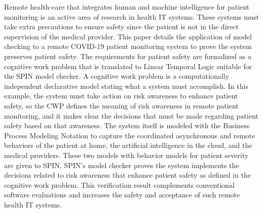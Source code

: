 Remote health-care that integrates human and machine intelligence for patient monitoring is an active area of research in health IT systems. These systems must take extra precautions to ensure safety since the patient is not in the direct supervision of the medical provider. This paper details the application of model checking to a remote COVID-19 patient monitoring system to prove the system preserves patient safety. The requirements for patient safety are formalized as a cognitive work problem that is translated to Linear Temporal Logic suitable for the SPIN model checker. A cognitive work problem is a computationally independent declarative model stating what a system must accomplish. In this example, the system must take action on risk awareness to enhance patient safety, so the CWP defines the meaning of risk awareness in remote patient monitoring, and it makes clear the decisions that must be made regarding patient safety based on that awareness. The system itself is modeled with the Business Process Modeling Notation to capture the coordinated asynchronous and remote behaviors of the patient at home, the artificial intelligence in the cloud, and the medical providers. These two models with behavior models for patient severity are given to SPIN. SPIN's model checker proves the system implements the decisions related to risk awareness that enhance patient safety as defined in the cognitive work problem. This verification result complements conventional software evaluations and increases the safety and acceptance of such remote health IT systems.

